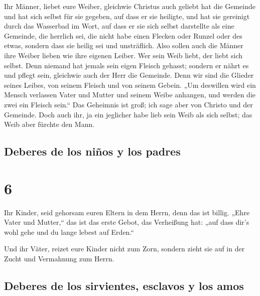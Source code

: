  Ihr Männer, liebet eure Weiber, gleichwie Christus auch
geliebt hat die Gemeinde und hat sich selbst für sie gegeben,
 auf dass er sie heiligte, und hat sie gereinigt durch
das Wasserbad im Wort,  auf dass er sie sich selbst
darstellte als eine Gemeinde, die herrlich sei, die nicht habe einen
Flecken oder Runzel oder des etwas, sondern dass sie heilig sei und
unsträflich.  Also sollen auch die Männer ihre Weiber
lieben wie ihre eigenen Leiber. Wer sein Weib liebt, der liebt sich
selbst.  Denn niemand hat jemals sein eigen Fleisch
gehasst; sondern er nährt es und pflegt sein, gleichwie auch der Herr
die Gemeinde.  Denn wir sind die Glieder seines Leibes,
von seinem Fleisch und von seinem Gebein.  „Um deswillen
wird ein Mensch verlassen Vater und Mutter und seinem Weibe anhangen,
und werden die zwei ein Fleisch sein.``  Das Geheimnis
ist groß; ich sage aber von Christo und der Gemeinde. 
Doch auch ihr, ja ein jeglicher habe lieb sein Weib als sich selbst; das
Weib aber fürchte den Mann.

\hypertarget{deberes-de-los-niuxf1os-y-los-padres}{%
\subsection{Deberes de los niños y los
padres}\label{deberes-de-los-niuxf1os-y-los-padres}}

\hypertarget{section-5}{%
\section{6}\label{section-5}}

 Ihr Kinder, seid gehorsam euren Eltern in dem Herrn, denn
das ist billig.  „Ehre Vater und Mutter,`` das ist das
erste Gebot, das Verheißung hat:  „auf dass dir's wohl
gehe und du lange lebest auf Erden.``

 Und ihr Väter, reizet eure Kinder nicht zum Zorn, sondern
zieht sie auf in der Zucht und Vermahnung zum Herrn.

\hypertarget{deberes-de-los-sirvientes-esclavos-y-los-amos}{%
\subsection{Deberes de los sirvientes, esclavos y los
amos}\label{deberes-de-los-sirvientes-esclavos-y-los-amos}}

